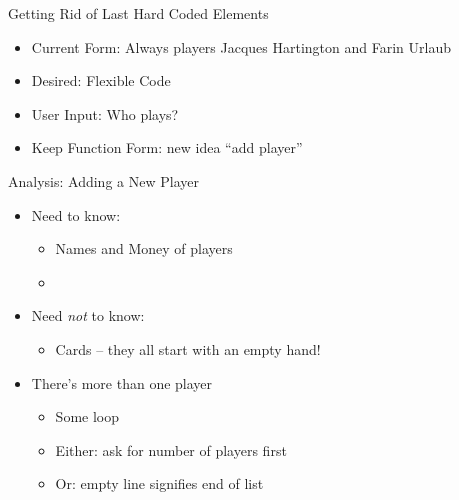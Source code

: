 
\begin{frame}{Getting Rid of Last Hard Coded Elements}
%
\begin{itemize}
\item Current Form: Always players Jacques Hartington and Farin Urlaub
\item Desired: Flexible Code
\item[\Thus] User Input: Who plays?
\item Keep Function Form: new idea \enquote{add player}
\end{itemize}
%
\end{frame}


\begin{frame}{Analysis: Adding a New Player}
%
\begin{itemize}
\item Need to know:
	\begin{itemize}
	\item Names and Money of players
	\item[\Thus] 
	\end{itemize}
\item Need \emph{not} to know:
	\begin{itemize}
	\item Cards -- they all start with an empty hand!
	\end{itemize}
\item There's more than one player
	\begin{itemize}
	\item[\Thus] Some loop
	\item Either: ask for number of players first \Thus {}
	\item Or: empty line signifies end of list
	\end{itemize}
\end{itemize}
%
\end{frame}


